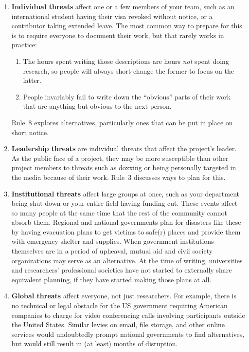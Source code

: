 \documentclass[10pt,letterpaper]{article}
\begin{document}
\begin{enumerate}
\item
  \textbf{Individual threats} affect one or a few members of your team,
  such as an international student having their visa revoked without notice, or a contributor taking extended leave.
  The most common way to prepare for this is to require everyone to document their work,
  but that rarely works in practice:
  \begin{enumerate}
  \item
    The hours spent writing those descriptions are hours \emph{not} spent doing research,
    so people will always short-change the former to focus on the latter.
  \item
    People invariably fail to write down the ``obvious'' parts of their work
    that are anything but obvious to the next person.
  \end{enumerate}
  Rule~8 explores alternatives,
  particularly ones that can be put in place on short notice.

\item
  \textbf{Leadership threats} are individual threats that affect the project's leader.
  As the public face of a project, they may be more susceptible than other project members to threats such as doxxing or being personally targeted in the media because of their work.
  Rule~3 discusses ways to plan for this.

\item
  \textbf{Institutional threats} affect large groups at once,
  such as your department being shut down
  or your entire field having funding cut.
  These events affect so many people at the same time
  that the rest of the community cannot absorb them.
  Regional and national governments plan for disasters like these
  by having evacuation plans to get victims to safe(r) places
  and provide them with emergency shelter and supplies.
  When government institutions themselves are in a period of upheaval,
  mutual aid and civil society organizations may serve as an alternative.
  At the time of writing,
  universities and researchers' professional societies have not started to externally share equivalent planning, if they have started making those plans at all.

\item
  \textbf{Global threats} affect everyone,
  not just researchers.
  For example,
  there is no technical or legal obstacle for the US government
  requiring American companies to charge for video conferencing calls
  involving participants outside the United States.
  Similar levies on email,
  file storage,
  and other online services would undoubtedly prompt national governments to find alternatives,
  but would still result in (at least) months of disruption.

\end{enumerate}
\end{document}
